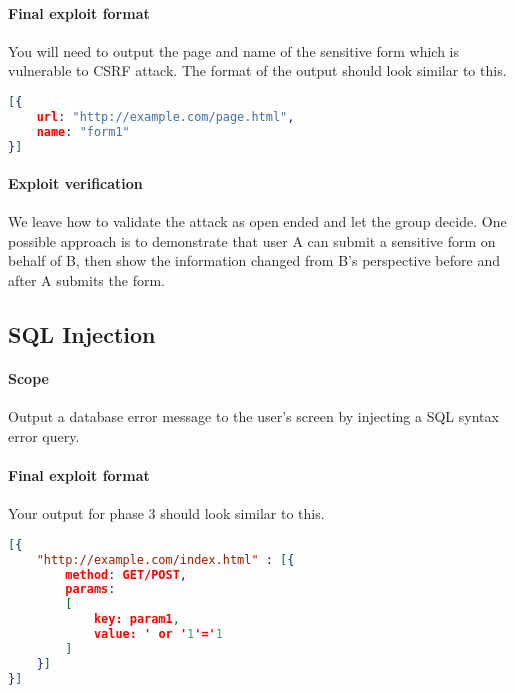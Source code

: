 \documentclass{article}[10pt]
\begin{document}
\paragraph{Final exploit format} You will need to output the page and name of the sensitive form which is vulnerable to CSRF attack. The format of the output should look similar to this.

\begin{lstlisting}[language=json,firstnumber=1]
[{
	url: "http://example.com/page.html",
	name: "form1"
}]
\end{lstlisting}

\paragraph{Exploit verification} We leave how to validate the attack as open ended and let the group decide. One possible approach is to demonstrate that user A can submit a sensitive form on behalf of B, then show the information changed from B's perspective before and after A submits the form.

\subsection{SQL Injection}
\paragraph{Scope} Output a database error message to the user's screen by injecting a SQL syntax error query.

\paragraph{Final exploit format} Your output for phase 3 should look similar to this.

\begin{lstlisting}[language=json,firstnumber=1]
[{
	"http://example.com/index.html" : [{
		method: GET/POST,
		params: 
		[
			key: param1,
			value: ' or '1'='1
		]
	}]
}]
\end{lstlisting}
\end{document}
